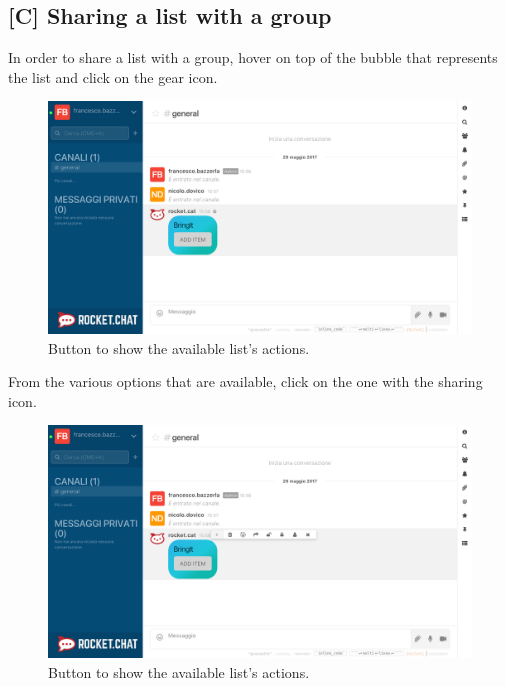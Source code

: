 \newpage
\subsection{[C] Sharing a list with a group}
In order to share a list with a group, hover on top of the bubble that represents the list and click on the gear icon.

\begin{figure}[H]
  \centering 
  \includegraphics[width=\textwidth]{Sections/3-HowToUse/Images/bubble_options_button.png}
  \caption{Button to show the available list's actions.}
\end{figure}

From the various options that are available, click on the one with the sharing icon.

\begin{figure}[H]
  \centering 
  \includegraphics[width=\textwidth]{Sections/3-HowToUse/Images/bubble_options.png}
  \caption{Button to show the available list's actions.}
\end{figure}


